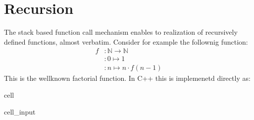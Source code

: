 \documentclass[a4paper,10pt,english]{jupyterBook}
\begin{document}
\section{Recursion}
\label{\detokenize{text/progtut/functions:recursion}}
\sphinxAtStartPar
The stack based function call mechanism enables to realization of recursively defined functions, almost verbatim. Consider for example the follownig function:
\begin{align*}
f&:\mathbb{N}\to\mathbb{N}\\
&:0\mapsto 1 \\
&:n\mapsto n \cdot f(n - 1)
\end{align*}
\sphinxAtStartPar
This is the well\sphinxhyphen{}known factorial function.
In C++ this is implemenetd directly as:

\begin{sphinxuseclass}{cell}\begin{sphinxVerbatimInput}

\begin{sphinxuseclass}{cell_input}
\begin{sphinxVerbatim}[commandchars=\\\{\}]
\end{sphinxVerbatim}

\end{sphinxuseclass}\end{sphinxVerbatimInput}

\end{sphinxuseclass}
\end{document}
